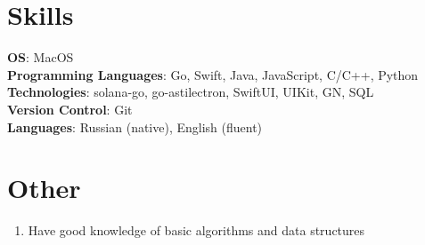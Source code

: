 \documentclass[letterpaper,10pt]{article}
\newcommand{\resumeSubHeadingListStart}{\begin{itemize}[leftmargin=0.15in, label={}]}
\newcommand{\resumeSubHeadingListEnd}{\end{itemize}}
\begin{document}
\section{Skills}
 \begin{itemize}[leftmargin=0.15in, label={}]
    \small{\item{
    \textbf{OS}{: MacOS} \\
     \textbf{Programming Languages}{: Go, Swift, Java, JavaScript, C/C++, Python} \\
     \textbf{Technologies}{: solana-go, go-astilectron, SwiftUI, UIKit, GN, SQL}\\
     \textbf{Version Control}{: Git} \\
     \textbf{Languages}{: Russian (native), English (fluent)} \\
    }}
 \end{itemize}

\section{Other}
\resumeSubHeadingListStart
    \begin{enumerate}
        \item Have good knowledge of basic algorithms and data structures
    \end{enumerate}
    \resumeSubHeadingListEnd
\end{document}
